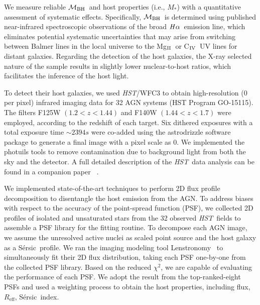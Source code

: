 \documentclass[twocolumn,trackchanges]{aastex63}
\newcommand{\hst}{{\it HST}}
\newcommand{\mbh}{$\mathcal M_{\rm BH}$}
\newcommand{\mr}{$Mag_{\rm ~R}$}
\newcommand{\halpha}{${\it H}\alpha$}
\newcommand{\sersic}{S\'ersic}
\newcommand{\lenstronomy}{{\sc Lenstronomy}}
\newcommand{\reff}{{$R_{\mathrm{eff}}$}}
\newcommand{\mstar}{{$M_*$}}
\newcommand{\Mgii}{Mg$_{\rm II}$}
\newcommand{\Civ}{C$_{\rm IV}$}
\newcommand{\blue}[1]{{{#1}}}
\begin{document}
We measure reliable \mbh\ and host properties (i.e., \mstar) with a quantitative assessment of systematic effects. Specifically, \mbh\ is determined using published near-infrared spectroscopic observations of the broad \halpha\ emission line, which eliminates potential systematic uncertainties that may arise from switching between Balmer lines in the local universe to the \Mgii\ or \Civ\ UV lines for distant galaxies. Regarding the detection of the host galaxies, the X-ray selected nature of the sample results in slightly lower nuclear-to-host ratios, which facilitates the inference of the host light. 

\blue{To detect their host galaxies, we used \hst/WFC3 to obtain high-resolution (0\farcs0642 per pixel) infrared imaging data for 32 AGN systems (HST Program GO-15115). The filters F125W $(1.2<z<1.44)$ and F140W $(1.44<z<1.7)$ were employed, according to the redshift of each target. Six dithered exposures with a total exposure time $\sim2394s$ were co-added using the {\sc astrodrizzle} software package to generate a final image with a pixel scale as 0\farcs0642. We implemented the {\sc photuils} tools to remove contamination due to background light from both the sky and the detector. A full detailed description of the \hst\ data analysis can be found in a companion paper ~\citep[][D19 hereafter]{Ding2019}.}

\blue{We implemented state-of-the-art techniques to perform 2D flux profile decomposition to disentangle the host emission from the AGN. To address biases with respect to the accuracy of the point-spread function (PSF), we collected 2D profiles of isolated and unsaturated stars from the 32 observed \hst\ fields to assemble a PSF library for the fitting routine. To decompose each AGN image, we assume the unresolved active nuclei as scaled point source and the host galaxy as a \sersic\ profile. We ran the imaging modeling tool \lenstronomy~\citep{lenstronomy} to simultaneously fit their 2D flux distribution, taking each PSF one-by-one from the collected PSF library. Based on the reduced $\chi^2$, we are capable of evaluating the performance of each PSF. We adopt the result from the top-ranked-eight PSFs and used a weighting process to obtain the host properties, including flux, \reff, \sersic\ index.}
\end{document}
